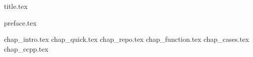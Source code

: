 \documentclass[12pt,letterpaper,oneside]{scrbook}
\begin{document}
\frontmatter
{title.tex}
 
\tableofcontents

{preface.tex}

\mainmatter

{chap_intro.tex}
{chap_quick.tex}
{chap_repo.tex}
{chap_function.tex}
{chap_cases.tex}
{chap_ccpp.tex}
\backmatter
\end{document}
